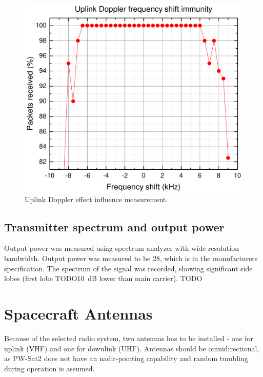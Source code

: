\begin{figure}
    \centering
    \includegraphics[width=0.6\paperwidth]{img/6/uplink_doppler.pdf}
    \caption{Uplink Doppler effect influence measurement.}
    \label{4_uplink_doppler_measurement}
\end{figure}


\subsection{Transmitter spectrum and output power}
Output power was measured using spectrum analyzer with wide resolution bandwidth. Output power was measured to be \SI{28}{\dBm}, which is in the manufacturers specification.
The spectrum of the signal was recorded, showing significant side lobes (first lobe TODO\SI{10}{\dB} lower than main carrier).
TODO








\section{Spacecraft Antennas}
Because of the selected radio system, two antennas has to be installed - one for uplink (VHF) and one for downlink (UHF). Antennas should be omnidirectional, as PW-Sat2 does not have an nadir-pointing capability and random tumbling during operation is assumed.

